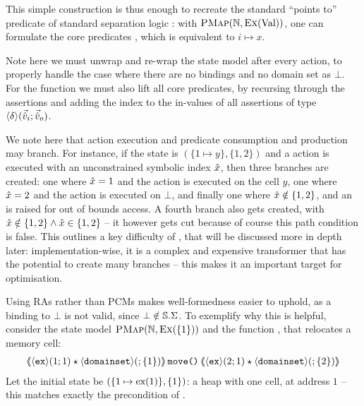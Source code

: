 This simple construction is thus enough to recreate the standard ``points to'' predicate of standard separation logic \cite{seplogic1, seplogic2}: with $\textsc{PMap}(\mathbb N, \textsc{Ex}(\text{Val}))$, one can formulate the core predicates , which is equivalent to $i \mapsto x$.

Note here we must unwrap and re-wrap the state model after every action, to properly handle the case where there are no bindings and no domain set as $\bot$. For the \fix{} function we must also lift all core predicates, by recursing through the assertions and adding the index to the in-values of all assertions of type $\left<\delta\right>\!(\vec{\hat{v}}_i;\vec{\hat{v}}_o)$.

We note here that action execution and predicate consumption and production may branch. For instance, if the state is $(\{ 1\mapsto y \}, \{ 1,2\})$ and a \load{} action is executed with an unconstrained symbolic index $\hat{x}$, then three branches are created: one where $\hat{x} = 1$ and the action is executed on the cell $y$, one where $\hat{x} = 2$ and the action is executed on $\bot$, and finally one where $\hat{x}\notin \{1,2\}$, and an \Err{} is raised for out of bounds access. A fourth branch also gets created, with $\hat{x}\notin \{ 1,2\} \land \hat{x}\in \{1,2\}$ -- it however gets cut because of course this path condition is false. This outlines a key difficulty of \PMap{}, that will be discussed more in depth later: implementation-wise, it is a complex and expensive transformer that has the potential to create many branches -- this makes it an important target for optimisation.

Using RAs rather than PCMs makes well-formedness easier to uphold, as a binding to $\bot$ is not valid, since $\bot \notin \mathbb S.\Sigma$. To exemplify why this is helpful, consider the state model $\textsc{PMap}(\mathbb N, \textsc{Ex}(\{1\}))$ and the function , that relocates a memory cell:
\begin{align*}
\ESLtriple{\corepred{\exP}{1}{1} \star \corepred{\domainset}{}{\{1\}}}{\code{move()}}{\corepred{\exP}{2}{1} \star \corepred{\domainset}{}{\{2\}}}
\end{align*}
Let the initial state be $(\{ 1\mapsto \text{ex}(1)\}, \{ 1\} )$: a heap with one cell, at address $1$ -- this matches exactly the precondition of .

